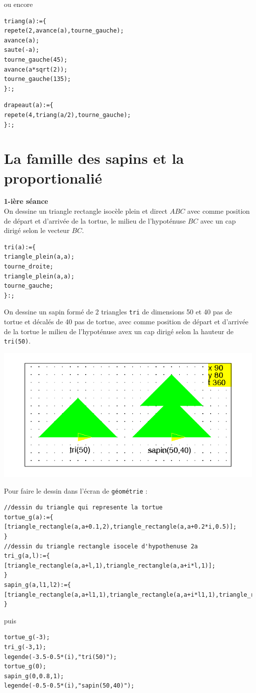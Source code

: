 \documentclass[a4paper,11pt]{book}
\begin{document}
ou encore
\begin{verbatim}
triang(a):={
repete(2,avance(a),tourne_gauche);
avance(a);
saute(-a);
tourne_gauche(45);
avance(a*sqrt(2));
tourne_gauche(135);
}:;
\end{verbatim}
\begin{verbatim}
drapeaut(a):={
repete(4,triang(a/2),tourne_gauche);
}:;
\end{verbatim}

\section{La famille des sapins et la proportionali\'e}
{\bf 1-i\`ere s\'eance}\\
On dessine un triangle rectangle isoc\`ele plein et direct $ABC$ avec comme 
position de d\'epart et d'arriv\'ee de la tortue, le milieu de l'hypot\'enuse 
$BC$ avec un cap dirig\'e selon le vecteur $BC$.
\begin{verbatim}
tri(a):={
triangle_plein(a,a);
tourne_droite;
triangle_plein(a,a);
tourne_gauche;
}:;
\end{verbatim}
On dessine un sapin form\'e de 2 triangles {\tt tri} de dimensions 50 et 40 pas
de tortue et  d\'ecal\'es de 40 pas de tortue, avec comme position de d\'epart 
et d'arriv\'ee de la tortue le milieu de l'hypot\'enuse avex un  cap dirig\'e 
selon la hauteur de {\tt tri(50)}.

%
\includegraphics[width=\textwidth]{tortsapin}

Pour faire le dessin dans l'\'ecran de {\tt g\'eom\'etrie} :
\begin{verbatim}
//dessin du triangle qui represente la tortue
tortue_g(a):={
[triangle_rectangle(a,a+0.1,2),triangle_rectangle(a,a+0.2*i,0.5)];
}
//dessin du triangle rectangle isocele d'hypothenuse 2a
tri_g(a,l):={
[triangle_rectangle(a,a+l,1),triangle_rectangle(a,a+i*l,1)];
}
sapin_g(a,l1,l2):={
[triangle_rectangle(a,a+l1,1),triangle_rectangle(a,a+i*l1,1),triangle_rectangle(a+i*l2,a+i*l2+l2,1),triangle_rectangle(a+i*l2,a+2*i*l2,1)];
}
\end{verbatim}
puis 
\begin{verbatim}
tortue_g(-3);
tri_g(-3,1);
legende(-3.5-0.5*(i),"tri(50)");
tortue_g(0);
sapin_g(0,0.8,1);
legende(-0.5-0.5*(i),"sapin(50,40)");
\end{verbatim}
\end{document}
